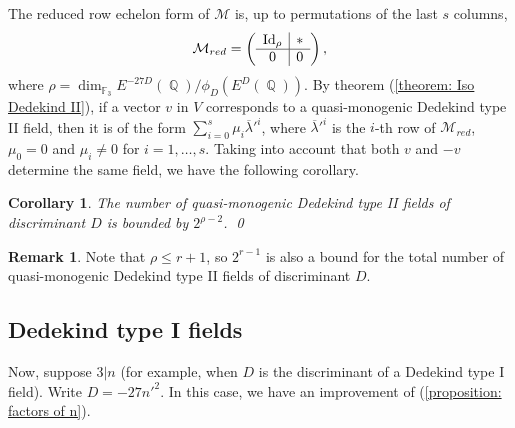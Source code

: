 \documentclass[oneside]{amsart}
\newcommand{\id}{\textnormal{Id}}
\DeclareMathOperator{\QQ}{\mathbb{Q}}
\newtheorem{corollary}[X]{Corollary}
\theoremstyle{definition}
\newtheorem{remark}[X]{Remark}
\begin{document}
The reduced row echelon form of $\mathcal{M}$ is, up to permutations of the last $s$ columns, 
\begin{equation}
    \label{equation: reduced row echelon form}
    \mathcal{M}_{red} = \left(
    \begin{array}{c|c}
        \id_\rho&*\\\hline
        0&0
    \end{array}
    \right),
\end{equation}
where $\rho = \dim_{\mathbb{F}_3}E^{-27D}(\QQ)/\phi_D(E^D(\QQ))$. By theorem (\ref{theorem: Iso Dedekind II}), if a vector $v$ in $V$ corresponds to a quasi-monogenic Dedekind type II field, then it is of the form $\sum_{i = 0}^s\mu_i\overline{\lambda}'^i$, where $\overline{\lambda}'^i$ is the $i$-th row of $\mathcal{M}_{red}$, $\mu_0 = 0$ and $\mu_i \neq 0$ for $i = 1, \dots, s$. Taking into account that both $v$ and $-v$ determine the same field, we have the following corollary. 
\begin{corollary}
    The number of quasi-monogenic Dedekind type II fields of discriminant $D$ is bounded by $2^{\rho-2}$. \qed
\end{corollary}
\begin{remark}
    Note that $\rho \leq r + 1$, so $2^{r - 1}$ is also a bound for the total number of quasi-monogenic Dedekind type II fields of discriminant $D$.
\end{remark}

\subsection{Dedekind type I fields}
\label{subsection: Main Dedekind type I results}
Now, suppose $3|n$ (for example, when $D$ is the discriminant of a Dedekind type I field). Write $D = -27n'^2$. In this case, we have an improvement of (\ref{proposition: factors of n}).
\end{document}
